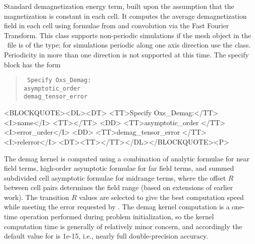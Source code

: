 \begin{description}
%
\item[Oxs\_Demag:]
   Standard demagnetization energy term, built upon
   the assumption that the magnetization is constant in each cell.
   It computes the average demagnetization field in each cell using
   formulae from \cite{aharoni1998,newell1993} and convolution
   via the Fast Fourier Transform.  This class supports non-periodic
   simulations if the mesh object in the \MIF\ file is of the
   type; for simulations periodic along one axis direction use the
   class.  Periodicity in more than one direction is not supported at
   this time.  The specify block has the form
   \begin{latexonly}
      \begin{quote}\tt
        Specify Oxs\_Demag: \ocb\\
        \bi asymptotic\_order \\
        \bi demag\_tensor\_error \\
      \ccb
      \end{quote}
   \end{latexonly}
   \begin{rawhtml}
   <BLOCKQUOTE><DL><DT>
   <TT>Specify Oxs_Demag:</TT><I>name</I> <TT>{</TT>
       <DD> <TT>asymptotic_order </TT><I>error_order</I>
       <DD> <TT>demag_tensor_error </TT><I>relerror</I>
   <DT><TT>}</TT></DL></BLOCKQUOTE><P>
   \end{rawhtml}
   The demag kernel is computed using a combination of analytic formulae
   for near field terms, high-order asymptotic formulae for far field
   terms, and summed subdivided cell asymptotic formulae for midrange
   terms, where the offset $R$ between cell pairs determines the field
   range (based on extensions of earlier work\cite{lebecki2008}).
   The transition $R$ values are selected to give the best computation
   speed while meeting the error requested by . The
   demag kernel computation is a one-time operation performed during
   problem initialization, so the kernel computation time is generally
   of relatively minor concern, and accordingly the default value for
    is 1e-15, i.e., nearly full double-precision
   accuracy.


\end{description}
